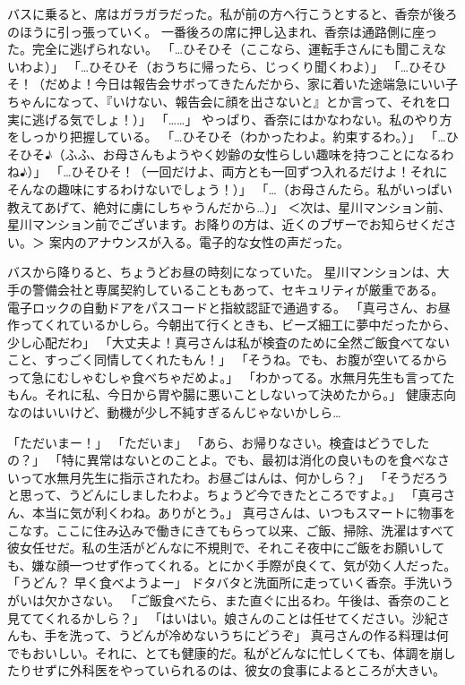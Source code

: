 バスに乗ると、席はガラガラだった。私が前の方へ行こうとすると、香奈が後ろのほうに引っ張っていく。
一番後ろの席に押し込まれ、香奈は通路側に座った。完全に逃げられない。
「…ひそひそ（ここなら、運転手さんにも聞こえないわよ）」
「…ひそひそ（おうちに帰ったら、じっくり聞くわよ）」
「…ひそひそ！（だめよ！今日は報告会サボってきたんだから、家に着いた途端急にいい子ちゃんになって、『いけない、報告会に顔を出さないと』とか言って、それを口実に逃げる気でしょ！）」
「……」
やっぱり、香奈にはかなわない。私のやり方をしっかり把握している。
「…ひそひそ（わかったわよ。約束するわ。）」
「…ひそひそ♪（ふふ、お母さんもようやく妙齢の女性らしい趣味を持つことになるわね♪）」
「…ひそひそ！（一回だけよ、両方とも一回ずつ入れるだけよ！それにそんなの趣味にするわけないでしょう！）」
「…（お母さんたら。私がいっぱい教えてあげて、絶対に虜にしちゃうんだから…）」
＜次は、星川マンション前、星川マンション前でございます。お降りの方は、近くのブザーでお知らせください。＞
案内のアナウンスが入る。電子的な女性の声だった。

バスから降りると、ちょうどお昼の時刻になっていた。
星川マンションは、大手の警備会社と専属契約していることもあって、セキュリティが厳重である。
電子ロックの自動ドアをパスコードと指紋認証で通過する。
「真弓さん、お昼作ってくれているかしら。今朝出て行くときも、ビーズ細工に夢中だったから、少し心配だわ」
「大丈夫よ！真弓さんは私が検査のために全然ご飯食べてないこと、すっごく同情してくれたもん！」
「そうね。でも、お腹が空いてるからって急にむしゃむしゃ食べちゃだめよ。」
「わかってる。水無月先生も言ってたもん。それに私、今日から胃や腸に悪いことしないって決めたから。」
健康志向なのはいいけど、動機が少し不純すぎるんじゃないかしら…

「ただいまー！」
「ただいま」
「あら、お帰りなさい。検査はどうでしたの？」
「特に異常はないとのことよ。でも、最初は消化の良いものを食べなさいって水無月先生に指示されたわ。お昼ごはんは、何かしら？」
「そうだろうと思って、うどんにしましたわよ。ちょうど今できたところですよ。」
「真弓さん、本当に気が利くわね。ありがとう。」
真弓さんは、いつもスマートに物事をこなす。ここに住み込みで働きにきてもらって以来、ご飯、掃除、洗濯はすべて彼女任せだ。私の生活がどんなに不規則で、それこそ夜中にご飯をお願いしても、嫌な顔一つせず作ってくれる。とにかく手際が良くて、気が効く人だった。
「うどん？ 早く食べようよー」
ドタバタと洗面所に走っていく香奈。手洗いうがいは欠かさない。
「ご飯食べたら、また直ぐに出るわ。午後は、香奈のこと見ててくれるかしら？」
「はいはい。娘さんのことは任せてください。沙紀さんも、手を洗って、うどんが冷めないうちにどうぞ」
真弓さんの作る料理は何でもおいしい。それに、とても健康的だ。私がどんなに忙しくても、体調を崩したりせずに外科医をやっていられるのは、彼女の食事によるところが大きい。

